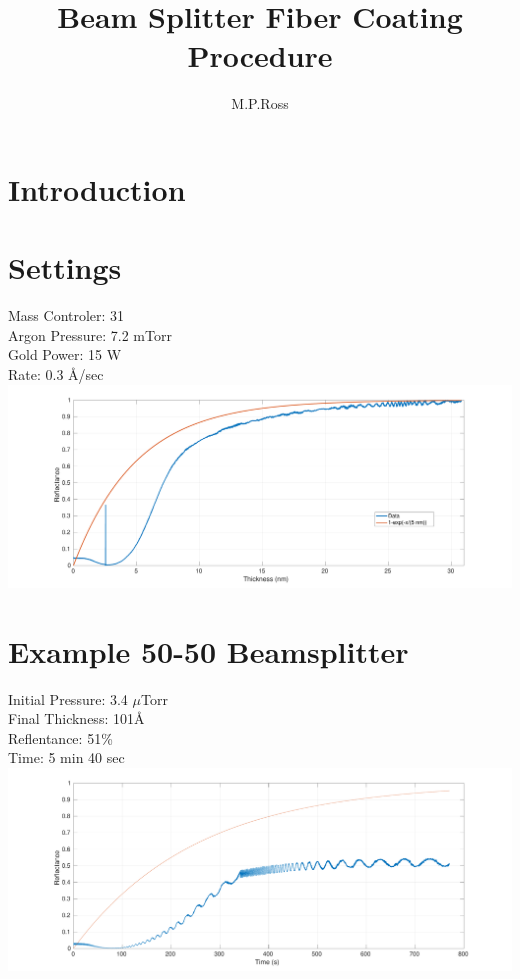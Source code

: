\documentclass{article}
\title{Beam Splitter Fiber Coating Procedure}
\author{M.P.Ross}
\begin{document}
\maketitle
\section{Introduction}
\section{Settings}
Mass Controler: 31\\
Argon Pressure: 7.2 mTorr\\
Gold Power: 15 W\\
Rate: 0.3 \AA/sec\\
\includegraphics[width=\textwidth]{Gold_Coating_Fiber.pdf}
\section{Example 50-50 Beamsplitter}
Initial Pressure: 3.4 $\mu$Torr\\
Final Thickness: 101\AA\\
Reflentance: 51\%\\
Time:  5 min 40 sec\\
\includegraphics[width=\textwidth]{BS_Coating_Fiber_Time.pdf}
\end{document}
